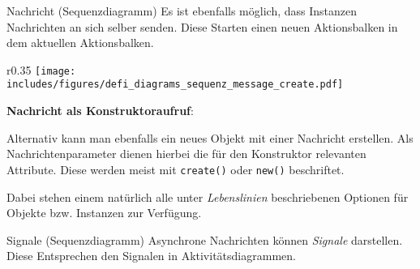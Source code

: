 \begin{diag}{Nachricht (Sequenzdiagramm)}
    Es ist ebenfalls möglich, dass Instanzen Nachrichten an sich selber senden.
    Diese Starten einen neuen Aktionsbalken in dem aktuellen Aktionsbalken.

    \begin{wrapfigure}{r}{0.35\textwidth}
        \centering
        \texttt{[image: includes/figures/defi\_diagrams\_sequenz\_message\_create.pdf]}
    \end{wrapfigure}
    \textbf{Nachricht als Konstruktoraufruf}:

    Alternativ kann man ebenfalls ein neues Objekt mit einer Nachricht erstellen.
    Als Nachrichtenparameter dienen hierbei die für den Konstruktor relevanten Attribute.
    Diese werden meist mit \texttt{create()} oder \texttt{new()} beschriftet.

    Dabei stehen einem natürlich alle unter \emph{Lebenslinien} beschriebenen Optionen für Objekte bzw. Instanzen zur Verfügung.
\end{diag}

\begin{bonus}{Signale (Sequenzdiagramm)}
    Asynchrone Nachrichten können \emph{Signale} darstellen.
    Diese Entsprechen den Signalen in Aktivitätsdiagrammen.
\end{bonus}

